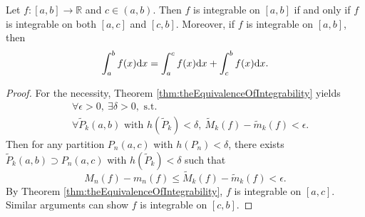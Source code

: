 \begin{thm}
  \label{thm:integralAdditivity}
  Let $f:[a,b]\rightarrow \mathbb{R}$ and
  $c\in(a,b)$. Then $f$ is integrable on $[a,b]$ if and only if
  $f$ is integrable on both $[a,c]$ and $[c,b]$.
  Moreover, if $f$ is integrable on $[a,b]$, then
  \begin{equation}
    \label{eq:integralAdditivity}
    \int_{a}^{b}f(x)\mathrm{d} x=
    \int_{a}^{c}f(x)\mathrm{d} x+\int_{c}^{b}f(x)\mathrm{d} x.
  \end{equation}
\end{thm}
\begin{proof}
  For the necessity,
  Theorem \ref{thm:theEquivalenceOfIntegrability} yields
  \begin{align*}
    &\ \forall\epsilon>0,\ \exists \delta>0,\text{ s.t. }\\
    &\ \forall \widetilde{P}_{k}(a,b)\text{ with }
      h(\widetilde{P}_{k})<\delta,
      \ \widetilde{M}_{k}(f)-\widetilde{m}_{k}(f)<\epsilon.
  \end{align*}
  Then for any partition $P_{n}(a,c)$ with $h(P_{n})<\delta$, there exists
  $\widetilde{P}_{k}(a,b)\supset P_{n}(a,c)$ with
  $h(\widetilde{P}_{k})<\delta$
  such that
  \begin{displaymath}
    M_{n}(f)-m_{n}(f)\le \widetilde{M}_{k}(f)-\widetilde{m}_{k}(f)<\epsilon.
  \end{displaymath}
  By Theorem \ref{thm:theEquivalenceOfIntegrability},
  $f$ is integrable on $[a,c]$. Similar arguments can show
  $f$ is integrable on $[c,b]$.
  

\end{proof}
